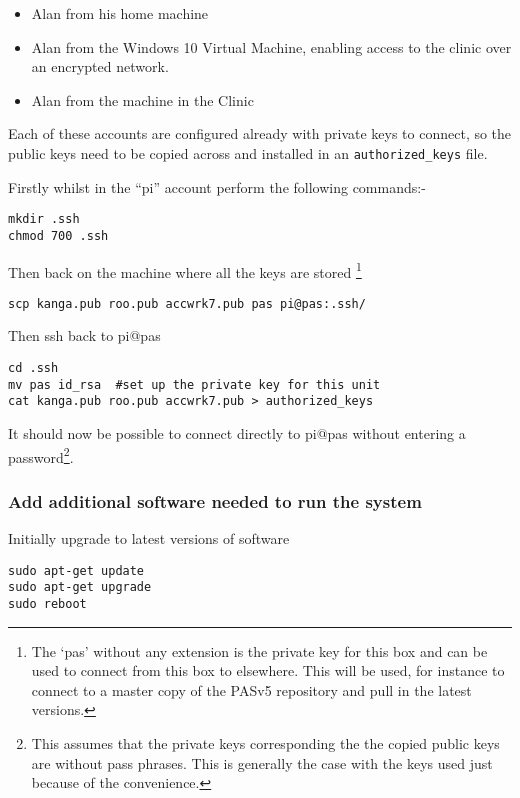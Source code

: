 \documentclass[Draft]{akc}
\begin{document}
\begin{itemize}
\item Alan from his home machine
\item Alan from the Windows 10 Virtual Machine, enabling access to the clinic over an encrypted network.
\item Alan from the machine in the Clinic
\end{itemize}

Each of these accounts are configured already with private keys to connect, so the public keys need to be copied
across and installed in an \texttt{authorized\_keys} file.

Firstly whilst in the ``pi'' account perform the following commands:-

\begin{lstlisting}
mkdir .ssh
chmod 700 .ssh
\end{lstlisting}

Then back on the machine where all the keys are stored \footnote{The `pas' without any extension is the private key for this box and can be used to connect from this box to elsewhere. This will be used, for instance to connect to a master copy of the PASv5 repository and pull in the latest versions.}

\begin{lstlisting}
scp kanga.pub roo.pub accwrk7.pub pas pi@pas:.ssh/
\end{lstlisting}

Then ssh back to pi@pas

\begin{lstlisting}
cd .ssh
mv pas id_rsa  #set up the private key for this unit
cat kanga.pub roo.pub accwrk7.pub > authorized_keys
\end{lstlisting}

It should now be possible to connect directly to pi@pas without entering a password\footnote{This
assumes that the private keys corresponding the the copied public keys are without pass phrases.
This is generally the case with the keys used just because of the convenience.}.

\subsubsection{Add additional software needed to run the system}

Initially upgrade to latest versions of software

\begin{lstlisting}
sudo apt-get update
sudo apt-get upgrade
sudo reboot
\end{lstlisting}
\end{document}
